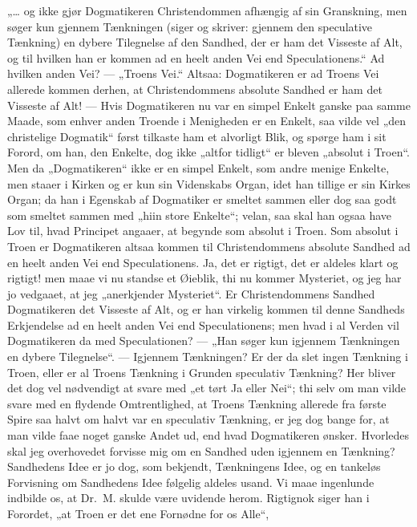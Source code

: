 „\ldots{} og ikke gjør Dogmatikeren Christendommen afhængig af sin
Granskning, men søger kun gjennem Tænkningen (siger og skriver:
gjennem den speculative Tænkning) en dybere Tilegnelse af den
Sandhed, der er ham det Visseste af Alt, og til hvilken han er
kommen ad en heelt anden Vei end Speculationens.“ Ad hvilken anden
Vei? --- „Troens Vei.“ Altsaa: Dogmatikeren er ad Troens Vei
allerede kommen derhen, at Christendommens absolute Sandhed er ham
det Visseste af Alt! --- Hvis Dogmatikeren nu var en simpel Enkelt
 ganske paa samme Maade, som enhver anden Troende i Menigheden er
en Enkelt, saa vilde vel „den christelige Dogmatik“ først tilkaste
ham et alvorligt Blik, og spørge ham i sit Forord, om han, den
Enkelte, dog ikke „altfor tidligt“ er bleven „absolut i Troen“.
Men da „Dogmatikeren“ ikke er en simpel Enkelt, som andre menige
Enkelte, men staaer i Kirken og er kun sin Videnskabs Organ, idet
han tillige er sin Kirkes Organ; da han i Egenskab af Dogmatiker
er smeltet sammen eller dog saa godt som smeltet sammen med „hiin
store Enkelte“; velan, saa skal han ogsaa have Lov til, hvad
Principet angaaer, at begynde som absolut i Troen. Som absolut i
Troen er Dogmatikeren altsaa kommen til Christendommens absolute
Sandhed ad en heelt anden Vei end Speculationens. Ja, det er
rigtigt, det er aldeles klart og rigtigt! men maae vi nu standse
et Øieblik, thi nu kommer Mysteriet, og jeg har jo vedgaaet, at
jeg „anerkjender Mysteriet“. Er Christendommens Sandhed
Dogmatikeren det Visseste af Alt, og er han virkelig kommen til
denne Sandheds Erkjendelse ad en heelt anden Vei end
Speculationens; men hvad i al Verden vil Dogmatikeren da med
Speculationen? --- „Han søger kun igjennem Tænkningen en dybere
Tilegnelse“. --- Igjennem Tænkningen? Er der da slet ingen
Tænkning i Troen, eller er al Troens Tænkning i Grunden speculativ
Tænkning? Her bliver det dog vel nødvendigt at svare med „et tørt
Ja eller Nei“; thi selv om man vilde svare med en flydende
Omtrentlighed, at Troens Tænkning allerede fra
 første Spire saa halvt om halvt var en speculativ Tænkning, er jeg
dog bange for, at man vilde faae noget ganske Andet ud, end hvad
Dogmatikeren ønsker. Hvorledes skal jeg overhovedet forvisse mig
om en Sandhed uden igjennem en Tænkning? Sandhedens Idee er jo
dog, som bekjendt, Tænkningens Idee, og en tankeløs Forvisning om
Sandhedens Idee følgelig aldeles usand. Vi maae ingenlunde
indbilde os, at Dr.\ M. skulde være uvidende herom. Rigtignok
siger han i Forordet, „at Troen er det ene Fornødne for os Alle“,
